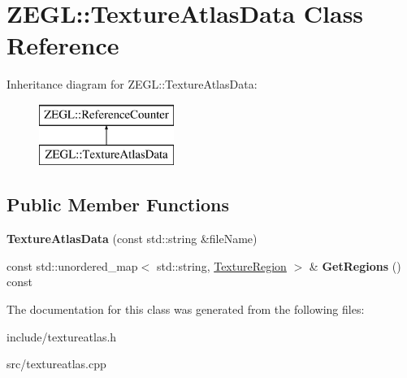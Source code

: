 \hypertarget{class_z_e_g_l_1_1_texture_atlas_data}{}\section{Z\+E\+G\+L\+:\+:Texture\+Atlas\+Data Class Reference}
\label{class_z_e_g_l_1_1_texture_atlas_data}
Inheritance diagram for Z\+E\+G\+L\+:\+:Texture\+Atlas\+Data\+:\begin{figure}[H]
\begin{center}
\leavevmode
\includegraphics[height=2.000000cm]{class_z_e_g_l_1_1_texture_atlas_data}
\end{center}
\end{figure}
\subsection*{Public Member Functions}
\begin{DoxyCompactItemize}
\item 
\hypertarget{class_z_e_g_l_1_1_texture_atlas_data_a9e06ec8a09a9e8d690053b68793afc81}{}{\bfseries Texture\+Atlas\+Data} (const std\+::string \&file\+Name)\label{class_z_e_g_l_1_1_texture_atlas_data_a9e06ec8a09a9e8d690053b68793afc81}

\item 
\hypertarget{class_z_e_g_l_1_1_texture_atlas_data_a348f45893ce3dccaaa44997c5f89d8d7}{}const std\+::unordered\+\_\+map$<$ std\+::string, \hyperlink{struct_z_e_g_l_1_1_texture_region}{Texture\+Region} $>$ \& {\bfseries Get\+Regions} () const \label{class_z_e_g_l_1_1_texture_atlas_data_a348f45893ce3dccaaa44997c5f89d8d7}

\end{DoxyCompactItemize}


The documentation for this class was generated from the following files\+:\begin{DoxyCompactItemize}
\item 
include/textureatlas.\+h\item 
src/textureatlas.\+cpp\end{DoxyCompactItemize}
